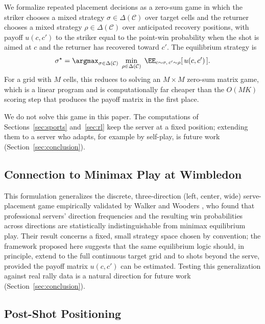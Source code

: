   We formalize repeated placement decisions as a zero-sum game in which the
  striker chooses a mixed strategy $\sigma \in \Delta(\mathcal{C})$ over target
  cells and the returner chooses a mixed strategy $\rho \in \Delta(\mathcal{C})$
  over anticipated recovery positions, with payoff $u(c, c')$ to the striker
  equal to the point-win probability when the shot is aimed at $c$ and the
  returner has recovered toward $c'$. The equilibrium strategy is
  \begin{equation}
  \sigma^\star = \argmax_{\sigma \in \Delta(\mathcal{C})} \;
  \min_{\rho \in \Delta(\mathcal{C})} \;
  \EE_{c \sim \sigma,\, c' \sim \rho}[\, u(c, c') \,] .
  \end{equation}
  For a grid with $M$ cells, this reduces to solving an $M \times M$ zero-sum
  matrix game, which is a linear program and is computationally far cheaper
  than the $O(MK)$ scoring step that produces the payoff matrix in the first
  place.

  We do not solve this game in this paper. The computations of
  Sections~\ref{sec:sports} and~\ref{sec:rl} keep the server at a fixed
  position; extending them to a server who adapts, for example by self-play, is
  future work (Section~\ref{sec:conclusion}).

  \subsection{Connection to Minimax Play at Wimbledon}\label{sec:wimbledon}

  This formulation generalizes the discrete, three-direction (left, center,
  wide) serve-placement game empirically validated by Walker and Wooders
  \cite{walker2001minimax}, who found that professional servers' direction
  frequencies and the resulting win probabilities across directions are
  statistically indistinguishable from minimax equilibrium play. Their result
  concerns a fixed, small strategy space chosen by convention; the framework
  proposed here suggests that the same equilibrium logic should, in principle,
  extend to the full continuous target grid and to shots beyond the serve,
  provided the payoff matrix $u(c, c')$ can be estimated. Testing this
  generalization against real rally data is a natural direction for future work
  (Section~\ref{sec:conclusion}).

  \subsection{Post-Shot Positioning}\label{sec:postshot}

